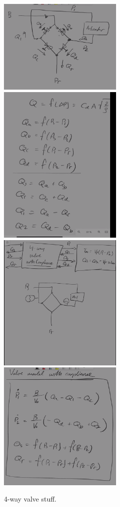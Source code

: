 \begin{figure}[H]
    \centering
    \includegraphics[width=6cm]{figures/4WayValve_MODSIM.png}
    \includegraphics[width=6cm]{figures/4WayValveVar_MODSIM.png}
    \includegraphics[width=6cm]{figures/4WayValveEndMe_MODSIM.png}
    \includegraphics[width=6cm]{figures/4WayValveCompliance_MODSIM.png}
    \caption{4-way valve stuff.}
    \label{fig:4wayvalve}
\end{figure}

